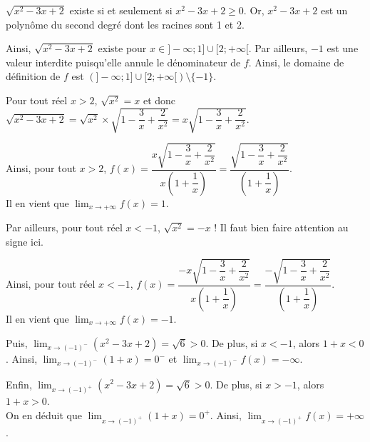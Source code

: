 \documentclass[11pt,fleqn, openany]{book} %
\begin{document}
\begin{solution}$\sqrt{x^2-3x+2}$ existe si et seulement si $x^2-3x+2\geqslant 0$. Or, $x^2-3x+2$ est un polynôme du second degré dont les racines sont 1 et 2.

\begin{center}
\end{center}

Ainsi, $\sqrt{x^2-3x+2}$ existe pour $x\in ]-\infty;1]\cup[2;+\infty[$. Par ailleurs, $-1$ est une valeur interdite puisqu'elle annule le dénominateur de $f$. Ainsi, le domaine de définition de $f$ est $(]-\infty;1]\cup[2;+\infty[) \setminus\{-1\}$.

Pour tout réel $x>2$, $\sqrt{x^2}=x$ et donc $\sqrt{x^2-3x+2}=\sqrt{x^2} \times \sqrt{1-\dfrac{3}{x}+\dfrac{2}{x^2}} =x\sqrt{1-\dfrac{3}{x}+\dfrac{2}{x^2}}$. 

Ainsi, pour tout $x>2$, $f(x)=\dfrac{x\sqrt{1-\dfrac{3}{x}+\dfrac{2}{x^2}}}{x\left(1+\dfrac{1}{x}\right)} = \dfrac{\sqrt{1-\dfrac{3}{x}+\dfrac{2}{x^2}}}{\left(1+\dfrac{1}{x}\right)}$.\\
Il en vient que $\displaystyle\lim_{x \to +\infty}f(x)=1$. 

Par ailleurs, pour tout réel $x<-1$, $\sqrt{x^2}=-x$ ! Il faut bien faire attention au signe ici. 

Ainsi, pour tout réel $x<-1$, $f(x)=\dfrac{-x\sqrt{1-\dfrac{3}{x}+\dfrac{2}{x^2}}}{x\left(1+\dfrac{1}{x}\right)} = \dfrac{-\sqrt{1-\dfrac{3}{x}+\dfrac{2}{x^2}}}{\left(1+\dfrac{1}{x}\right)}$.\\
Il en vient que $\displaystyle\lim_{x \to +\infty}f(x)=-1$. 

Puis, $\displaystyle\lim_{x\to (-1)^-}(x^2-3x+2)=\sqrt{6}>0$. De plus, si $x<-1$, alors $1+x<0$. Ainsi, $\displaystyle\lim_{x\to (-1)^-}(1+x)=0^-$ et $\displaystyle\lim_{x\to (-1)^-}f(x)=-\infty$.

Enfin, $\displaystyle\lim_{x\to (-1)^+}(x^2-3x+2)=\sqrt{6}>0$. De plus, si $x>-1$, alors $1+x>0$. \\On en déduit que $\displaystyle\lim_{x\to (-1)^+}(1+x)=0^+$. Ainsi, $\displaystyle\lim_{x\to (-1)^+}f(x)=+\infty$.\end{solution}
\end{document}
